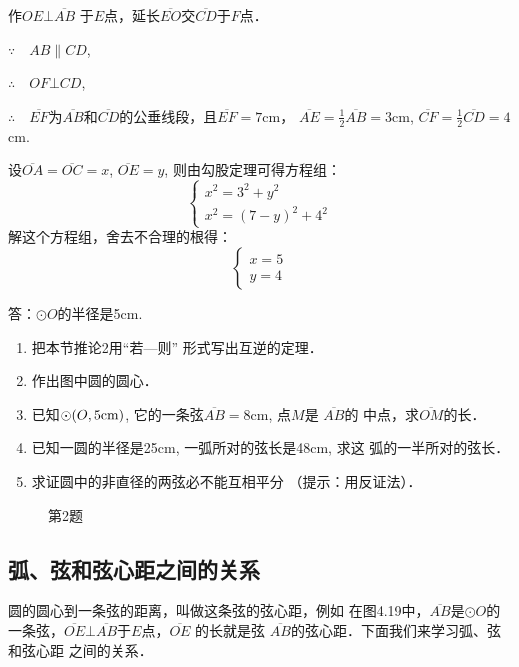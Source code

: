 \begin{solution}
    作$OE\bot \overline{AB}$
于$E$点，延长$\overline{EO}$交$\overline{CD}$于$F$点．

$\because\quad AB\parallel CD$,

$\therefore\quad OF\bot CD$,

$\therefore\quad \overline{EF}$为$\overline{AB}$和$\overline{CD}$的公垂线段，且$\overline{EF}=7$cm，
$\overline{AE}=\frac{1}{2}\overline{AB}=3$cm, $\overline{CF}=
\frac{1}{2}\overline{CD}=4$cm.

设$\overline{OA}=\overline{OC}=x$, $\overline{OE}=y$, 则由勾股定理可得方程组：
\[\begin{cases}
    x^2=3^2+y^2\\
    x^2=(7-y)^2+4^2
\end{cases}\]
解这个方程组，舍去不合理的根得：
\[\begin{cases}
    x=5\\y=4
\end{cases}\]

答：$\odot O$的半径是5cm.
\end{solution}

\begin{ex}
\begin{enumerate}
    \item 把本节推论2用“若—则”
    形式写出互逆的定理．
    \item 作出图中圆的圆心．
    \item 已知$\odot(O,5{\rm cm})$, 它的一条弦$\overline{AB}=8$cm, 点$M$是
    $\overline{AB}$的
    中点，求$\overline{OM}$的长．
    \item 已知一圆的半径是25cm, 一弧所对的弦长是48cm, 求这
    弧的一半所对的弦长．
    \item 求证圆中的非直径的两弦必不能互相平分
    （提示：用反证法）．
\end{enumerate}
\end{ex}

\begin{figure}[htp]
    \centering
{}
    \caption*{第2题}
\end{figure}

\subsection{弧、弦和弦心距之间的关系}
圆的圆心到一条弦的距离，叫做这条弦的弦心距，例如
在图4.19中，$\overline{AB}$是$\odot O$的一条弦，$\overline{OE}\bot \overline{AB}$于$E$点，$\overline{OE}$
的长就是弦
$\overline{AB}$的弦心距．下面我们来学习弧、弦和弦心距
之间的关系．

